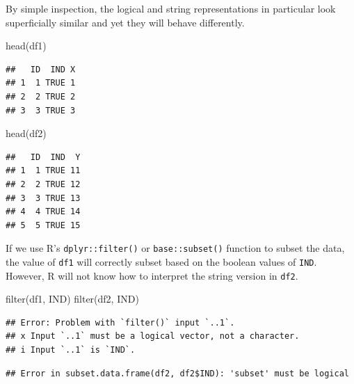 \documentclass[
]{krantz}
\makeatletter
\newenvironment{Shaded}{\begin{snugshade}}{\end{snugshade}}
\newcommand{\FunctionTok}[1]{\textcolor[rgb]{0,0,0}{#1}}
\newcommand{\NormalTok}[1]{#1}
\newcommand{\SpecialCharTok}[1]{\textcolor[rgb]{0,0,0}{#1}}
\newenvironment{kframe}{%
\medskip{}
\setlength{\fboxsep}{.8em}
 \def\at@end@of@kframe{}%
 \ifinner\ifhmode%
  \def\at@end@of@kframe{\end{minipage}}%
  \begin{minipage}{\columnwidth}%
 \fi\fi%
 \def\FrameCommand##1{\hskip\@totalleftmargin \hskip-\fboxsep
 \colorbox{shadecolor}{##1}\hskip-\fboxsep
     \hskip-\linewidth \hskip-\@totalleftmargin \hskip\columnwidth}%
 \MakeFramed {\advance\hsize-\width
   \@totalleftmargin\z@ \linewidth\hsize
   \@setminipage}}%
 {\par\unskip\endMakeFramed%
 \at@end@of@kframe}
\renewenvironment{Shaded}{\begin{kframe}}{\end{kframe}}
\makeatother
\begin{document}
By simple inspection, the logical and string representations in particular look superficially similar and yet they will behave differently.

\begin{Shaded}
\begin{Highlighting}[]
\FunctionTok{head}\NormalTok{(df1)}
\end{Highlighting}
\end{Shaded}

\begin{verbatim}
##   ID  IND X
## 1  1 TRUE 1
## 2  2 TRUE 2
## 3  3 TRUE 3
\end{verbatim}

\begin{Shaded}
\begin{Highlighting}[]
\FunctionTok{head}\NormalTok{(df2)}
\end{Highlighting}
\end{Shaded}

\begin{verbatim}
##   ID  IND  Y
## 1  1 TRUE 11
## 2  2 TRUE 12
## 3  3 TRUE 13
## 4  4 TRUE 14
## 5  5 TRUE 15
\end{verbatim}

If we use R's \texttt{dplyr::filter()} or \texttt{base::subset()} function to subset the data, the value of \texttt{df1} will correctly subset based on the boolean values of \texttt{IND}. However, R will not know how to interpret the string version in \texttt{df2}.

\begin{Shaded}
\begin{Highlighting}[]
\FunctionTok{filter}\NormalTok{(df1, IND)}
\FunctionTok{filter}\NormalTok{(df2, IND)}
\end{Highlighting}
\end{Shaded}

\begin{verbatim}
## Error: Problem with `filter()` input `..1`.
## x Input `..1` must be a logical vector, not a character.
## i Input `..1` is `IND`.
\end{verbatim}

\begin{Shaded}
\end{Shaded}

\begin{verbatim}
## Error in subset.data.frame(df2, df2$IND): 'subset' must be logical
\end{verbatim}
\end{document}
